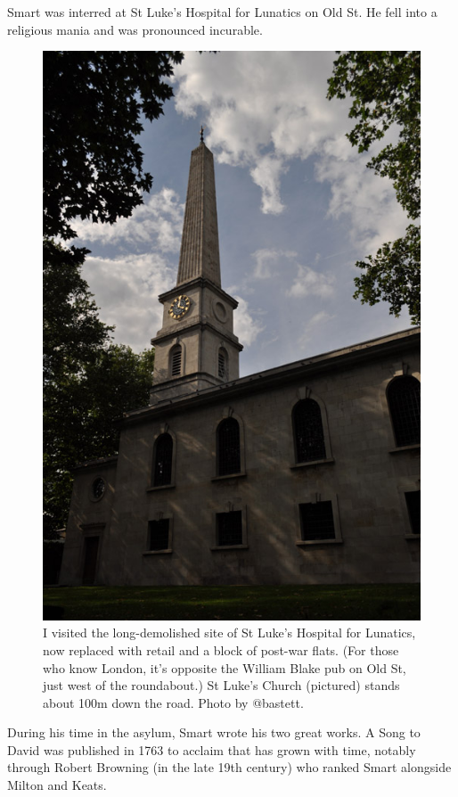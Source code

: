 Smart was interred at St Luke's Hospital for Lunatics on Old St. He fell into a religious mania and was pronounced incurable.

\begin{figure}
  \begin{center}
    \includegraphics{content/assets/jeoffry-stlukes}
  \end{center}
  \caption{I visited the long-demolished site of St Luke's Hospital for Lunatics, now replaced with retail and a block of post-war flats. (For those who know London, it's opposite the William Blake pub on Old St, just west of the roundabout.) St Luke's Church (pictured) stands about 100m down the road. Photo by @bastett.}
\end{figure}

During his time in the asylum, Smart wrote his two great works. A Song to David was published in 1763 to acclaim that has grown with time, notably through Robert Browning (in the late 19th century) who ranked Smart alongside Milton and Keats.

